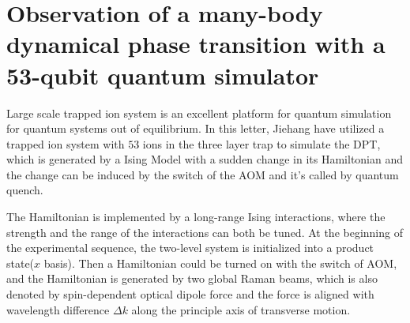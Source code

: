 \section{Observation of a many-body dynamical phase transition with a 53-qubit quantum simulator} %
\label{sec:observation_of_a_many_body_dynamical_phase_transition_with_a_53_qubit_quantum_simulator}

Large scale trapped ion system is an excellent platform for quantum simulation for quantum systems out of equilibrium. In this letter, Jiehang have utilized a trapped ion system with $53$ ions in the three layer trap to simulate the DPT, which is generated by a Ising Model with a sudden change in its Hamiltonian and the change can be induced by the switch of the AOM and it's called by quantum quench.

The Hamiltonian is implemented by a long-range Ising interactions, where the strength and the range of the interactions can both be tuned. At the beginning of the experimental sequence, the two-level system is initialized into a product state($x$ basis). Then a Hamiltonian could be turned on with the switch of AOM, and the Hamiltonian is generated by two global Raman beams, which is also denoted by spin-dependent optical dipole force and the force is aligned with wavelength difference $\Delta k$ along the principle axis of transverse motion.
